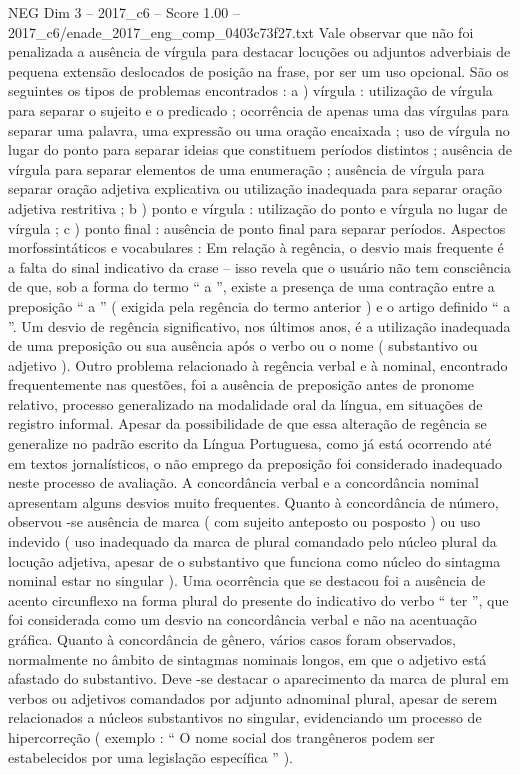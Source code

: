 \begin{textsample}{NEG Dim 3 – 2017\_c6 – Score 1.00 – 2017\_c6/enade\_2017\_eng\_comp\_0403c73f27.txt}
Vale observar que não foi penalizada a ausência de vírgula para destacar locuções ou adjuntos adverbiais de pequena extensão deslocados de posição na frase, por ser um uso opcional.
São os seguintes os tipos de problemas encontrados : a ) vírgula : utilização de vírgula para separar o sujeito e o predicado ; ocorrência de apenas uma das vírgulas para separar uma palavra, uma expressão ou uma oração encaixada ; uso de vírgula no lugar do ponto para separar ideias que constituem períodos distintos ; ausência de vírgula para separar elementos de uma enumeração ; ausência de vírgula para separar oração adjetiva explicativa ou utilização inadequada para separar oração adjetiva restritiva ; b ) ponto e vírgula : utilização do ponto e vírgula no lugar de vírgula ; c ) ponto final : ausência de ponto final para separar períodos.
Aspectos morfossintáticos e vocabulares : Em relação à regência, o desvio mais frequente é a falta do sinal indicativo da crase – isso revela que o usuário não tem consciência de que, sob a forma do termo “ a ”, existe a presença de uma contração entre a preposição “ a ” ( exigida pela regência do termo anterior ) e o artigo definido “ a ”.
Um desvio de regência significativo, nos últimos anos, é a utilização inadequada de uma preposição ou sua ausência após o verbo ou o nome ( substantivo ou adjetivo ).
Outro problema relacionado à regência verbal e à nominal, encontrado frequentemente nas questões, foi a ausência de preposição antes de pronome relativo, processo generalizado na modalidade oral da língua, em situações de registro informal.
Apesar da possibilidade de que essa alteração de regência se generalize no padrão escrito da Língua Portuguesa, como já está ocorrendo até em textos jornalísticos, o não emprego da preposição foi considerado inadequado neste processo de avaliação.
A concordância verbal e a concordância nominal apresentam alguns desvios muito frequentes.
Quanto à concordância de número, observou -se ausência de marca ( com sujeito anteposto ou posposto ) ou uso indevido ( uso inadequado da marca de plural comandado pelo núcleo plural da locução adjetiva, apesar de o substantivo que funciona como núcleo do sintagma nominal estar no singular ).
Uma ocorrência que se destacou foi a ausência de acento circunflexo na forma plural do presente do indicativo do verbo “ ter ”, que foi considerada como um desvio na concordância verbal e não na acentuação gráfica.
Quanto à concordância de gênero, vários casos foram observados, normalmente no âmbito de sintagmas nominais longos, em que o adjetivo está afastado do substantivo.
Deve -se destacar o aparecimento da marca de plural em verbos ou adjetivos comandados por adjunto adnominal plural, apesar de serem relacionados a núcleos substantivos no singular, evidenciando um processo de hipercorreção ( exemplo : “ O nome social dos trangêneros podem ser estabelecidos por uma legislação específica ” ).

\end{textsample}
